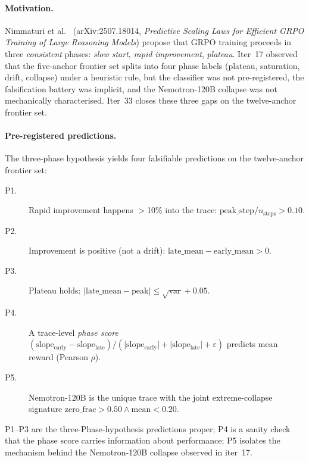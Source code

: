\documentclass{article}
\begin{document}
\paragraph{Motivation.}
Nimmaturi et al.~\citep{nimmaturi2025predictive} (arXiv:2507.18014,
\emph{Predictive Scaling Laws for Efficient GRPO Training of Large
Reasoning Models}) propose that GRPO training proceeds in three
\emph{consistent} phases: \emph{slow start}, \emph{rapid improvement},
\emph{plateau}. Iter~17 observed that the five-anchor frontier set
splits into four phase labels (plateau, saturation, drift, collapse)
under a heuristic rule, but the classifier was not pre-registered, the
falsification battery was implicit, and the Nemotron-120B collapse was
not mechanically characterised. Iter~33 closes these three gaps on the
twelve-anchor frontier set.

\paragraph{Pre-registered predictions.}
The three-phase hypothesis yields four falsifiable predictions on the
twelve-anchor frontier set:
\begin{description}
\item[P1.] Rapid improvement happens $>$10\% into the trace:
  $\mathrm{peak\_step}/n_{\mathrm{steps}} > 0.10$.
\item[P2.] Improvement is positive (not a drift):
  $\mathrm{late\_mean} - \mathrm{early\_mean} > 0$.
\item[P3.] Plateau holds: $\lvert \mathrm{late\_mean} - \mathrm{peak} \rvert
  \le \sqrt{\mathrm{var}} + 0.05$.
\item[P4.] A trace-level \emph{phase score}
  $(\mathrm{slope_{early}} - \mathrm{slope_{late}}) /
  (\lvert\mathrm{slope_{early}}\rvert + \lvert\mathrm{slope_{late}}\rvert
  + \varepsilon)$ predicts mean reward (Pearson $\rho$).
\item[P5.] Nemotron-120B is the unique trace with the joint
  extreme-collapse signature
  $\mathrm{zero\_frac} > 0.50 \wedge \mathrm{mean} < 0.20$.
\end{description}
P1--P3 are the three-Phase-hypothesis predictions proper; P4 is a
sanity check that the phase score carries information about
performance; P5 isolates the mechanism behind the Nemotron-120B
collapse observed in iter~17.
\end{document}
